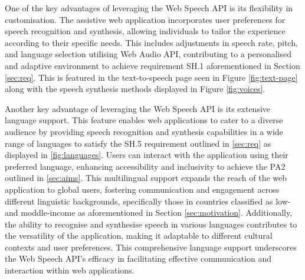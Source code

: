 \documentclass{l4proj}
\begin{document}
One of the key advantages of leveraging the Web Speech API is its flexibility in customisation. The assistive web application incorporates user preferences for speech recognition and synthesis, allowing individuals to tailor the experience according to their specific needs. This includes adjustments in speech rate, pitch, and language selection utilising Web Audio API, contributing to a personalised and adaptive environment to achieve requirement SH.1 aforementioned in Section \ref{sec:req}. This is featured in the text-to-speech page seen in Figure \ref{fig:text-page} along with the speech synthesis methods displayed in Figure \ref{fig:voices}.

Another key advantage of leveraging the Web Speech API is its extensive language support. This feature enables web applications to cater to a diverse audience by providing speech recognition and synthesis capabilities in a wide range of languages to satisfy the SH.5 requirement outlined in \ref{sec:req} as displayed in \ref{fig:languages}. Users can interact with the application using their preferred language, enhancing accessibility and inclusivity to achieve the PA2 outlined in \ref{sec:aims}. This multilingual support expands the reach of the web application to global users, fostering communication and engagement across different linguistic backgrounds, specifically those in countries classified as low- and moddle-income as aforementioned in Section \ref{sec:motivation}. Additionally, the ability to recognise and synthesise speech in various languages contributes to the versatility of the application, making it adaptable to different cultural contexts and user preferences. This comprehensive language support underscores the Web Speech API's efficacy in facilitating effective communication and interaction within web applications.
\end{document}
